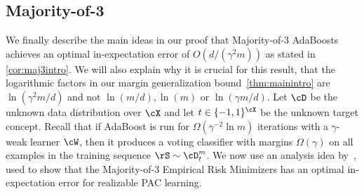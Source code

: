 \subsection{Majority-of-3}
\label{sec:sketchmaj3}
We finally describe the main ideas in our proof that Majority-of-3 AdaBoosts achieves an optimal in-expectation error of $O(d/(\gamma^2m))$ as stated in \cref{cor:maj3intro}. We will also explain why it is crucial for this result, that the logarithmic factors in our margin generalization bound~\cref{thm:mainintro} are $\ln(\gamma^2 m/d)$ and not $\ln(m/d), \ln(m)$ or $\ln(\gamma m/d)$. Let $\cD$ be the unknown data distribution over $\cX$ and let $t \in \{-1,1\}^\cX$ be the unknown target concept.
Recall that if AdaBoost is run for $\Omega(\gamma^{-2} \ln m)$ iterations with a $\gamma$-weak learner $\cW$, then it produces a voting classifier with margins $\Omega(\gamma)$ on all examples in the training sequence $\rS \sim \cD_t^m$. We now use an analysis idea by~\cite{majorityofthree}, used to show that the Majority-of-3 Empirical Risk Minimizers has an optimal in-expectation error for realizable PAC learning. 

